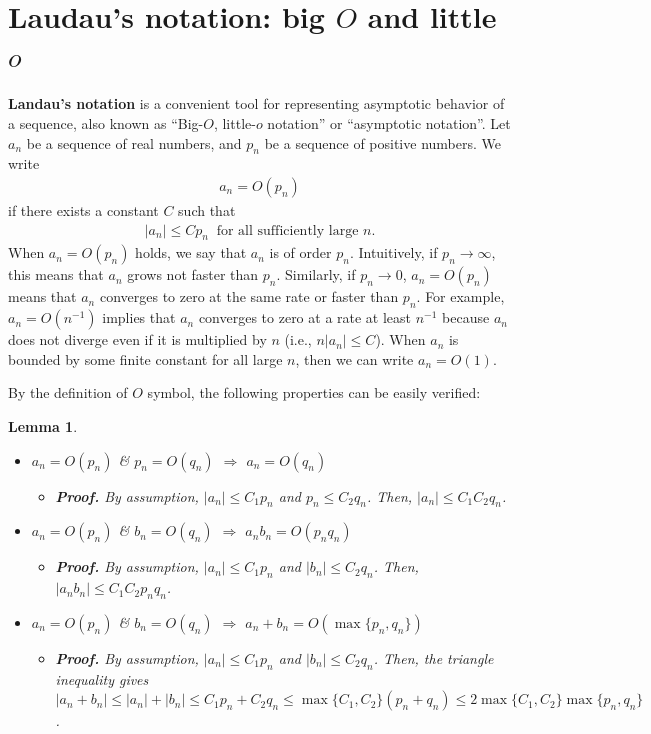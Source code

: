 \documentclass[10.5pt, A4paper, openany, uplatex]{book}
\newtheorem{lemma}[theorem]{Lemma}
\numberwithin{equation}{section}
\begin{document}
\section{Laudau's notation: big $O$ and little $o$}

\textbf{Landau's notation} is a convenient tool for representing asymptotic behavior of a sequence, also known as ``Big-$O$, little-$o$ notation'' or ``asymptotic notation''.
Let $a_n$ be a sequence of real numbers, and $p_n$ be a sequence of positive numbers.
We write
\begin{align*}
	a_n = O(p_n)
\end{align*}
if there exists a constant $C$ such that 
\begin{align*}
	|a_n| \le C p_n \;\; \text{for all sufficiently large $n$.}
\end{align*}
When $a_n = O(p_n)$ holds, we say that $a_n$ is of order $p_n$. 
Intuitively, if $p_n \to \infty$, this means that $a_n$ grows not faster than $p_n$.
Similarly, if $p_n \to 0$, $a_n = O(p_n)$ means that $a_n$ converges to zero at the same rate or faster than $p_n$.
For example, $a_n = O(n^{-1})$ implies that $a_n$ converges to zero at a rate at least $n^{-1}$ because $a_n$ does not diverge even if it is multiplied by $n$ (i.e., $n |a_n| \le C$).
When $a_n$ is bounded by some finite constant for all large $n$, then we can write $a_n = O(1)$.

By the definition of $O$ symbol, the following properties can be easily verified:
\begin{lemma}\label{lem:bigo}
\begin{itemize}
	\item $a_n = O(p_n)$ \& $p_n = O(q_n)$ $\Longrightarrow$ $a_n = O(q_n)$
	\begin{itemize}
		\item \upshape \textbf{Proof.} By assumption, $|a_n| \le C_1 p_n$ and $p_n \le C_2 q_n$. Then, $|a_n| \le C_1 C_2 q_n$.
	\end{itemize}
	\item $a_n = O(p_n)$ \& $b_n = O(q_n)$ $\Longrightarrow$ $a_n b_n = O(p_n q_n)$
	\begin{itemize}
		\item \upshape \textbf{Proof.} By assumption, $|a_n| \le C_1 p_n$ and $|b_n| \le C_2 q_n$.
		Then, $|a_n b_n| \le C_1 C_2 p_n q_n$.
	\end{itemize}
	\item $a_n = O(p_n)$ \& $b_n = O(q_n)$ $\Longrightarrow$ $a_n + b_n = O(\max\{p_n, q_n\})$
	\begin{itemize}
		\item \upshape \textbf{Proof.} By assumption, $|a_n| \le C_1 p_n$ and $|b_n| \le C_2 q_n$.
		Then, the triangle inequality gives $|a_n + b_n| \le |a_n| + |b_n| \le C_1 p_n + C_2 q_n \le \max\{C_1, C_2\} (p_n + q_n) \le 2 \max\{C_1, C_2\} \max\{p_n, q_n\}$.
	\end{itemize}
\end{itemize}
\end{lemma}
\end{document}

